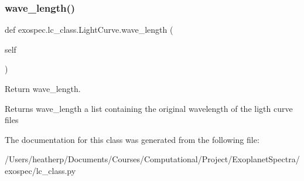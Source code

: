 \subsubsection{\texorpdfstring{wave\+\_\+length()}{wave\_length()}}
{\footnotesize\ttfamily def exospec.\+lc\+\_\+class.\+Light\+Curve.\+wave\+\_\+length (\begin{DoxyParamCaption}\item[{}]{self }\end{DoxyParamCaption})}



Return wave\+\_\+length. 

\begin{DoxyReturn}{Returns}
wave\+\_\+length a list containing the original wavelength of the ligth curve files 
\end{DoxyReturn}


The documentation for this class was generated from the following file\+:\begin{DoxyCompactItemize}
\item 
/\+Users/heatherp/\+Documents/\+Courses/\+Computational/\+Project/\+Exoplanet\+Spectra/exospec/lc\+\_\+class.\+py\end{DoxyCompactItemize}

